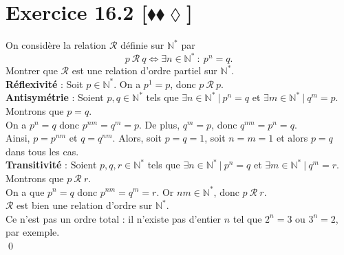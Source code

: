 \documentclass[10pt]{article}
\begin{document}
\section*{Exercice 16.2 [$\blacklozenge\blacklozenge\lozenge$]}
\begin{tcolorbox}[enhanced, width=7.6in, center, size=fbox, fontupper=\large, drop shadow southwest]
    On considère la relation $\mathcal{R}$ définie sur $\mathbb{N}^*$ par
    \begin{equation*}
        p ~ \mathcal{R} ~ q \iff \exists n \in \mathbb{N}^* ~ : ~ p^n = q.
    \end{equation*}
    Montrer que $\mathcal{R}$ est une relation d'ordre partiel sur $\mathbb{N}^*$.\\[0.15cm]
    \textbf{Réflexivité} : Soit $p \in \mathbb{N}^*$. On a $p^1=p$, donc $p ~ \mathcal{R} ~ p$.\\[0.1cm]
    \textbf{Antisymétrie} : Soient $p,q\in\mathbb{N}^*$ tels que $\exists n \in \mathbb{N}^* ~ | ~ p^n = q$ et $\exists m \in \mathbb{N}^* ~ | ~ q^m = p$. Montrons que $p=q$.\\
    On a $p^n = q$ donc $p^{nm} = q^m = p$. De plus, $q^m = p$, donc $q^{nm} = p^n = q$.\\
    Ainsi, $p = p^{nm}$ et $q=q^{nm}$. Alors, soit $p = q = 1$, soit $n=m=1$ et alors $p=q$ dans tous les cas.\\[0.1cm]
    \textbf{Transitivité} : Soient $p,q,r \in \mathbb{N}^*$ tels que $\exists n \in \mathbb{N}^* ~ | ~ p^n = q$ et $\exists m \in \mathbb{N}^* ~ | ~ q^m = r$. Montrons que $p ~ \mathcal{R} ~ r$.\\
    On a que $p^{n} = q$ donc $p^{nm}=q^m=r$. Or $nm \in \mathbb{N}^*$, donc $p ~ \mathcal{R} ~ r$.\\[0.2cm]
    $\mathcal{R}$ est bien une relation d'ordre sur $\mathbb{N}^*$.\\
    Ce n'est pas un ordre total : il n'existe pas d'entier $n$ tel que $2^n=3$ ou $3^n=2$, par exemple.\\
    \qed
\end{tcolorbox}
\end{document}
